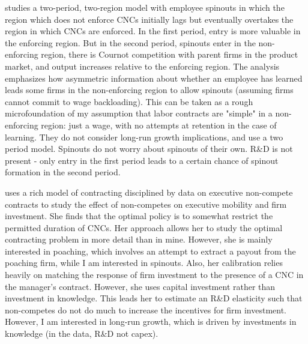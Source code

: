 \documentclass[12pt,english]{article}
\theoremstyle{remark}
\begin{document}
\cite{franco_covenants_2008} studies a two-period, two-region model with employee spinouts in which the region which does not enforce CNCs initially lags but eventually overtakes the region in which CNCs are enforced. In the first period, entry is more valuable in the enforcing region. But in the second period, spinouts enter in the non-enforcing region, there is Cournot competition with parent firms in the product market, and output increases relative to the enforcing region. The analysis emphasizes how asymmetric information about whether an employee has learned leads some firms in the non-enforcing region to allow spinouts (assuming firms cannot commit to wage backloading). This can be taken as a rough microfoundation of my assumption that labor contracts are "simple" in  a non-enforcing region: just a wage, with no attempts at retention in the case of learning. They do not consider long-run growth implications, and use a two period model. Spinouts do not worry about spinouts of their own. R\&D is not present - only entry in the first period leads to a certain chance of spinout formation in the second period. 

\cite{shi_restrictions_2018} uses a rich model of contracting disciplined by data on executive non-compete contracts to study the effect of non-competes on executive mobility and firm investment. She finds that the optimal policy is to somewhat restrict the permitted duration of CNCs. Her approach allows her to study the optimal contracting problem in more detail than in mine. However, she is mainly interested in poaching, which involves an attempt to extract a payout from the poaching firm, while I am interested in spinouts. Also, her calibration relies heavily on matching the response of firm investment to the presence of a CNC in the manager's contract. However, she uses capital investment rather than investment in knowledge. This leads her to estimate an R\&D elasticity such that non-competes do not do much to increase the incentives for firm investment. However, I am interested in long-run growth, which is driven by investments in knowledge (in the data, R\&D not capex).
\end{document}
